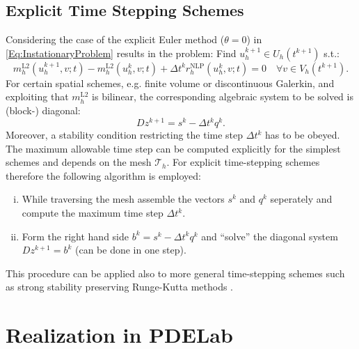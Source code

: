 \documentclass[a4paper,12pt]{article}
\begin{document}
\subsection*{Explicit Time Stepping Schemes}

Considering the case of the explicit Euler method ($\theta=0$) in \eqref{Eq:InstationaryProblem}
results in the problem: Find $u_h^{k+1}\in U_h(t^{k+1})$ s.t.:
\begin{equation*}
 m_h^\text{L2}(u_h^{k+1},v;t)-m_h^\text{L2}(u_h^{k},v;t) +
\Delta t^k r_h^\text{NLP}(u_h^{k},v;t) = 0 
\quad \forall v\in V_h(t^{k+1}).
\end{equation*}
For certain spatial schemes, e.g. finite volume or discontinuous Galerkin,
and exploiting that $m_h^\text{L2}$ is bilinear, the corresponding algebraic system
to be solved is (block-) diagonal:
\begin{equation}
Dz^{k+1} = s^k - \Delta t^k q^k.
\end{equation}
Moreover, a stability condition restricting the time step $\Delta t^k$ 
has to be obeyed. The maximum allowable time step can be computed
explicitly for the simplest schemes and depends on the mesh $\mathcal{T}_h$.
For explicit time-stepping schemes therefore the following algorithm is employed:
\begin{enumerate}[i)]
\item While traversing the mesh assemble the vectors $s^k$ and
$q^k$ seperately and compute the maximum time step $\Delta t^k$.
\item Form the right hand side $b^k=s^k - \Delta t^k q^k$ and ``solve'' the 
diagonal system $Dz^{k+1} = b^k$ (can be done in one step).
\end{enumerate}
This procedure can be applied also to more general time-stepping schemes
such as strong stability preserving Runge-Kutta methods \cite{shu:88}.

\section{Realization in PDELab}
\end{document}
